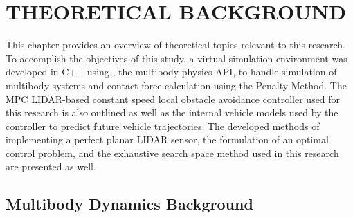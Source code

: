 \documentclass[12pt,onecolumn]{report}
\newcommand{\CHRONO}{{\sffamily{{Chrono}}}}
\begin{document}

\chapter{THEORETICAL BACKGROUND}\label{c:background}

This chapter provides an overview of theoretical topics relevant to this research. To accomplish the objectives of this study, a virtual simulation environment was developed in C++ using {\CHRONO}, the multibody physics API, to handle simulation of multibody systems and contact force calculation using the Penalty Method. The MPC LIDAR-based constant speed local obstacle avoidance controller used for this research is also outlined as well as the internal vehicle models used by the controller to predict future vehicle trajectories. The developed methods of implementing a perfect planar LIDAR sensor, the formulation of an optimal control problem, and the exhaustive search space method used in this research are presented as well.

\section{Multibody Dynamics Background}\label{s:MBD}
\end{document}
